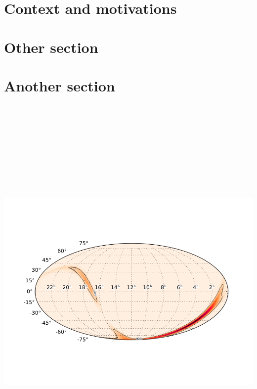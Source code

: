 \documentclass[a0,portrait]{a0poster}
\begin{document}
\begin{multicols}{2} %


 \begin{abstract}
\lipsum[20]
 \end{abstract}

\section*{Context and motivations}

\lipsum

\section*{Other section}

\lipsum

\section*{Another section}

\lipsum[20]

\begin{center}\vspace{.5cm}
    \includegraphics[height=20cm]{figures/test.png}
\end{center}


\end{multicols}
\end{document}

